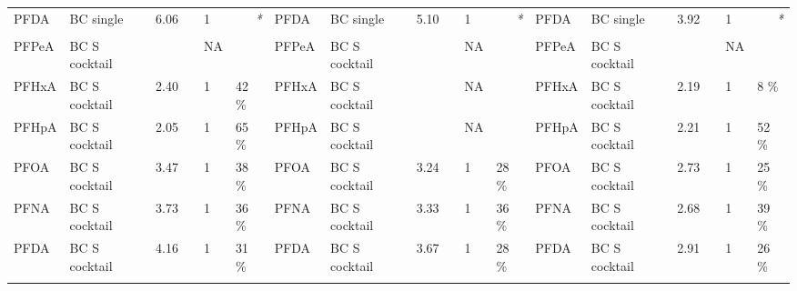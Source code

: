 \begin{sidewaystable}
{\begin{threeparttable}
\begin{tabular}{llllllllllllllllll}
PFDA     & BC single      & 6.06   &           & 1  & \multicolumn{1}{r}{\textit{*}} & PFDA     & BC single      & 5.10   &           & 1  & \multicolumn{1}{r}{\textit{*}} & PFDA     & BC single      & 3.92   &           & 1  & \multicolumn{1}{r}{\textit{*}} \\
         &                &        &           &    &                                &          &                &        &           &    &                                &          &                &        &           &    &                                \\
PFPeA    & BC S cocktail &        &           & NA &                                & PFPeA    & BC S cocktail &        &           & NA &                                & PFPeA    & BC S cocktail &        &           & NA &                                \\
PFHxA    & BC S cocktail & 2.40   &           & 1  & 42 \%                          & PFHxA    & BC S cocktail &        &           & NA &                                & PFHxA    & BC S cocktail & 2.19   &           & 1  & 8 \%                           \\
PFHpA    & BC S cocktail & 2.05   &           & 1  & 65 \%                          & PFHpA    & BC S cocktail &        &           & NA &                                & PFHpA    & BC S cocktail & 2.21   &           & 1  & 52 \%                          \\
PFOA     & BC S cocktail & 3.47   &           & 1  & 38 \%                          & PFOA     & BC S cocktail & 3.24   &           & 1  & 28 \%                          & PFOA     & BC S cocktail & 2.73   &           & 1  & 25 \%                          \\
PFNA     & BC S cocktail & 3.73   &           & 1  & 36 \%                          & PFNA     & BC S cocktail & 3.33   &           & 1  & 36 \%                          & PFNA     & BC S cocktail & 2.68   &           & 1  & 39 \%                          \\
PFDA     & BC S cocktail & 4.16   &           & 1  & 31 \%                          & PFDA     & BC S cocktail & 3.67   &           & 1  & 28 \%                          & PFDA     & BC S cocktail & 2.91   &           & 1  & 26 \%                          \\
         &                &        &           &    &                                &          &                &        &           &    &                                &          &                &        &           &    &                                \\

\end{tabular}
\end{threeparttable}}
\end{sidewaystable}
